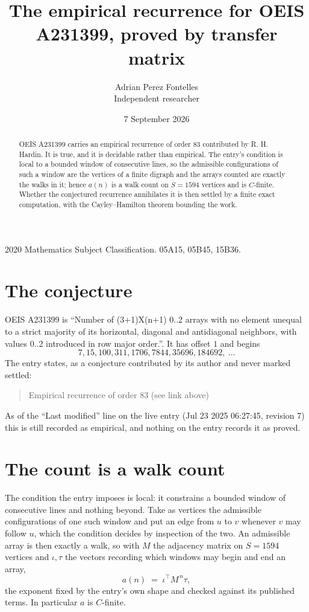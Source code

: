 \documentclass[11pt,a4paper]{article}
\title{The empirical recurrence for OEIS A231399, proved by transfer matrix}
\author{Adrian Perez Fontelles\\ \small Independent researcher}
\date{7 September 2026}
\theoremstyle{plain}
\theoremstyle{definition}
\begin{document}
\maketitle

\begin{abstract}
OEIS A231399 carries an empirical recurrence of order $83$ contributed by R. H. Hardin. It is
true, and it is decidable rather than empirical. The entry's condition is local to a bounded window of consecutive lines, so
the admissible configurations of such a window are the vertices of a finite digraph and the
arrays counted are exactly the walks in it; hence $a(n)$ is a walk count on $S=1594$ vertices
and is $C$-finite. Whether the conjectured recurrence annihilates it is then settled by a
finite exact computation, with the Cayley--Hamilton theorem bounding the work.
\end{abstract}

\noindent\small 2020 Mathematics Subject Classification. 05A15, 05B45, 15B36.\normalsize

\section{The conjecture}

OEIS A231399 is ``Number of (3+1)X(n+1) 0..2 arrays with no element unequal to a strict majority of its horizontal, diagonal and antidiagonal neighbors, with values 0..2 introduced in row major order.''. It has offset $1$ and begins
\[
7, 15, 100, 311, 1706, 7844, 35696, 184692,\ \dots
\]
The entry states, as a conjecture contributed by its author and never marked settled:
\begin{quote}
Empirical recurrence of order 83 (see link above)
\end{quote}
As of the ``Last modified'' line on the live entry (Jul 23 2025 06:27:45, revision 7) this is still
recorded as empirical, and nothing on the entry records it as proved.

\section{The count is a walk count}

The condition the entry imposes is local: it constrains a bounded window of consecutive lines and nothing beyond. Take as
vertices the admissible configurations of one such window and put an edge from $u$ to $v$
whenever $v$ may follow $u$, which the condition decides by inspection of the two. An
admissible array is then exactly a walk, so with $M$ the adjacency matrix on $S=1594$ vertices
and $\iota,\tau$ the vectors recording which windows may begin and end an array,
\[
a(n)\;=\;\iota^{\!\top}M^{\,n}\tau ,
\]
the exponent fixed by the entry's own shape and checked against its published terms. In
particular $a$ is $C$-finite.
\end{document}
